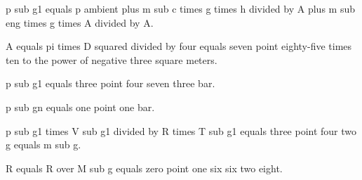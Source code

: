 p sub g1 equals p ambient plus m sub c times g times h divided by A plus m sub eng times g times A divided by A.

A equals pi times D squared divided by four equals seven point eighty-five times ten to the power of negative three square meters.

p sub g1 equals three point four seven three bar.

p sub gn equals one point one bar.

p sub g1 times V sub g1 divided by R times T sub g1 equals three point four two g equals m sub g.

R equals R over M sub g equals zero point one six six two eight.